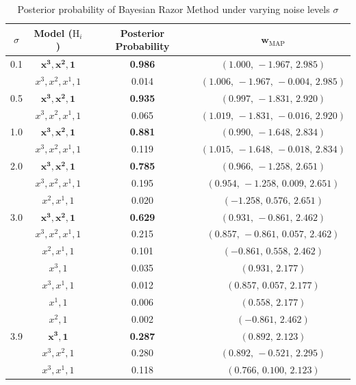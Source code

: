 \begin{table}
\centering
\caption{Posterior probability of Bayesian Razor Method under varying noise levels $\sigma$} 
\label{tab:Bayesian_Razor} 
\begin{tabular}{cccc}
\toprule
$\sigma$ & Model ($\mathrm{H}_i$) & Posterior Probability & $\boldsymbol{w}_{\mathrm{MAP}}$ \\
\midrule
0.1 & $\mathbf{x^3, x^2, 1}$ & \textbf{0.986} & $(1.000,\,-1.967,\,2.985)$ \\
    & $x^3, x^2, x^1, 1$     & 0.014          & $(1.006,\,-1.967,\,-0.004,\,2.985)$ \\
\midrule
0.5 & $\mathbf{x^3, x^2, 1}$ & \textbf{0.935} & $(0.997,\,-1.831,\,2.920)$ \\
    & $x^3, x^2, x^1, 1$     & 0.065          & $(1.019,\,-1.831,\,-0.016,\,2.920)$ \\
\midrule
1.0 & $\mathbf{x^3, x^2, 1}$ & \textbf{0.881} & $(0.990,\,-1.648,\,2.834)$ \\
    & $x^3, x^2, x^1, 1$    & 0.119          & $(1.015,\,-1.648,\,-0.018,\,2.834)$ \\
\midrule
2.0 & $\mathbf{x^3, x^2, 1}$ & \textbf{0.785} & $(0.966,\,-1.258,\,2.651)$ \\
    & $x^3, x^2, x^1, 1$    & 0.195          & $(0.954,\,-1.258,\,0.009,\,2.651)$ \\
    & $x^2, x^1, 1$          & 0.020          & $(-1.258,\,0.576,\,2.651)$ \\
\midrule
3.0 & $\mathbf{x^3, x^2, 1}$ & \textbf{0.629} & $(0.931,\,-0.861,\,2.462)$ \\
    & $x^3, x^2, x^1, 1$    & 0.215          & $(0.857,\,-0.861,\,0.057,\,2.462)$ \\
    & $x^2, x^1, 1$          & 0.101          & $(-0.861,\,0.558,\,2.462)$ \\
    & $x^3, 1$                & 0.035          & $(0.931,\,2.177)$ \\
    & $x^3, x^1, 1$          & 0.012          & $(0.857,\,0.057,\,2.177)$ \\
    & $x^1, 1$                & 0.006          & $(0.558,\,2.177)$ \\
    & $x^2, 1$                & 0.002          & $(-0.861,\,2.462)$ \\
\midrule    
3.9 & $\mathbf{x^3, 1}$       & \textbf{0.287} & $(0.892,\,2.123)$ \\
    & $x^3, x^2, 1$          & 0.280          & $(0.892,\,-0.521,\,2.295)$ \\
    & $x^3, x^1, 1$          & 0.118          & $(0.766,\,0.100,\,2.123)$ \\

\end{tabular}
\end{table}
